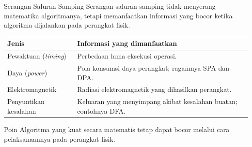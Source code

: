 \documentclass[aspectratio=169,11pt]{beamer}
\begin{document}
\begin{frame}{Serangan Saluran Samping}
    \footnotesize
    Serangan saluran samping tidak menyerang matematika algoritmanya, tetapi
    memanfaatkan informasi yang bocor ketika algoritma dijalankan pada
    perangkat fisik.
    \vspace{0.1cm}
    \begin{tabularx}{\linewidth}{@{}>{\raggedright\arraybackslash}p{3.0cm}
        >{\raggedright\arraybackslash}X@{}}
        \toprule
        \textbf{Jenis} & \textbf{Informasi yang dimanfaatkan} \\
        \midrule
        Pewaktuan (\textit{timing}) & Perbedaan lama eksekusi operasi. \\
        \addlinespace
        Daya (\textit{power}) & Pola konsumsi daya perangkat; ragamnya SPA
        dan DPA. \\
        \addlinespace
        Elektromagnetik & Radiasi elektromagnetik yang dihasilkan perangkat. \\
        \addlinespace
        Penyuntikan kesalahan & Keluaran yang menyimpang akibat kesalahan
        buatan; contohnya DFA. \\
        \bottomrule
    \end{tabularx}
    \vspace{0.15cm}
    \begin{alertblock}{Poin}
        Algoritma yang kuat secara matematis tetap dapat bocor melalui cara
        pelaksanaannya pada perangkat fisik.
    \end{alertblock}
\end{frame}
\end{document}
